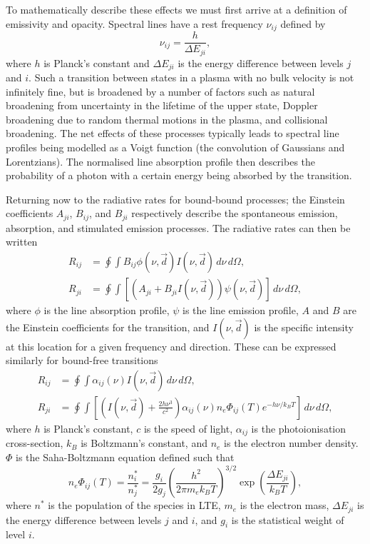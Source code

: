To mathematically describe these effects we must first arrive at a definition of emissivity and opacity.
Spectral lines have a rest frequency $\nu_{ij}$  defined by
\begin{equation}
    \nu_{ij} = \frac{h}{\Delta E_{ji}},
\end{equation}
where $h$ is Planck's constant and $\Delta E_{ji}$ is the energy difference between levels $j$ and $i$.
Such a transition between states in a plasma with no bulk velocity is not infinitely fine, but is broadened by a number of factors such as natural broadening from uncertainty in the lifetime of the upper state, Doppler broadening due to random thermal motions in the plasma, and collisional broadening.
The net effects of these processes typically leads to spectral line profiles being modelled as a Voigt function (the convolution of Gaussians and Lorentzians). The normalised line absorption profile then describes the probability of a photon with a certain energy being absorbed by the transition.


Returning now to the radiative rates for bound-bound processes; the Einstein coefficients $A_{ji}$, $B_{ij}$, and $B_{ji}$ respectively describe the spontaneous emission, absorption, and stimulated emission processes.
The radiative rates can then be written
\begin{align}
    R_{ij} &= \oint \int B_{ij} \phi(\nu, \vec{d}) I(\nu, \vec{d})\,d\nu\,d\Omega,\\
    R_{ji} &= \oint \int \left[\left(A_{ji} + B_{ji} I(\nu, \vec{d})\right)\psi(\nu, \vec{d}) \right]\,d\nu\,d\Omega,
    \label{Eq:BbRates}
\end{align}
where $\phi$ is the line absorption profile, $\psi$ is the line emission profile, $A$ and $B$ are the Einstein coefficients for the transition, and $I(\nu, \vec{d})$ is the specific intensity at this location for a given frequency and direction.
These can be expressed similarly for bound-free transitions
\begin{align}
    R_{ij} &= \oint \int \alpha_{ij}(\nu) I(\nu, \vec{d})\,d\nu\,d\Omega,\\
    R_{ji} &= \oint \int \left[\left(I(\nu, \vec{d}) + \frac{2h\nu^3}{c^2}\right) \alpha_{ij}(\nu)n_e\Phi_{ij}(T) e^{-h\nu/k_B T} \right]\,d\nu\,d\Omega,
\end{align}
where $h$ is Planck's constant, $c$ is the speed of light, $\alpha_{ij}$ is the photoionisation cross-section, $k_B$ is Boltzmann's constant, and $n_e$ is the electron number density.
$\Phi$ is the Saha-Boltzmann equation defined such that
\begin{equation}
    n_e\Phi_{ij}(T) = \frac{n^*_i}{n^*_j} = \frac{g_i}{2g_j}\left( \frac{h^2}
    {2\pi m_e k_B T} \right)^{3/2} \exp{\left(  \frac{\Delta E_{ji}}{k_B T}\right)},
\end{equation}
where $n^*$ is the population of the species in LTE, $m_e$ is the electron mass, $\Delta E_{ji}$ is the energy difference between levels $j$ and $i$, and $g_i$ is the statistical weight of level $i$.

